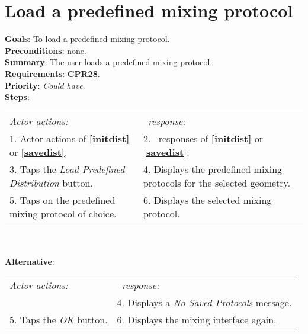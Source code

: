   \section{Load a predefined mixing protocol}
  \label{loadpredprot}
  \textbf{Goals}: To load a predefined mixing protocol.\\
  \textbf{Preconditions}: none.\\
  \textbf{Summary}: The user loads a predefined mixing protocol.\\
  \textbf{Requirements}: \textbf{CPR28}.\\
  \textbf{Priority}: \emph{Could have}.\\
  \textbf{Steps}: \\
  \begin{tabular}{ p{} p{} }
  	\emph{Actor actions:} & \emph{\projectname\ response:} \\
  	1. Actor actions of \textbf{\ref{initdist}} or  \textbf{\ref{savedist}}. & 2. \projectname\ responses of \textbf{\ref{initdist}} or  \textbf{\ref{savedist}}. \\
	3. Taps the \emph{Load Predefined Distribution} button. & 4. Displays the predefined mixing protocols for the selected geometry. \\
	5. Taps on the predefined mixing protocol of choice. & 6. Displays the selected mixing protocol. \\
  \end{tabular}
  	 \\
     \\\textbf{Alternative}: \\
    \begin{tabular}{ p{} p{} }
  	\emph{Actor actions:} & \emph{\projectname\ response:} \\
            & 4. Displays a \emph{No Saved Protocols} message. \\
    5. Taps the \emph{OK} button. & 6. Displays the mixing interface again. \\
  \end{tabular}

